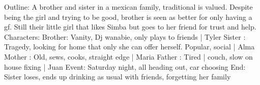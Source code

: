    Outline: A brother and sister in a mexican family, traditional is valued. Despite being the girl and trying to be good, brother
        is seen as better for only having a gf. Still their little girl that likes Simba but goes to her friend for trust and help.
        Characters:
                Brother: Vanity, Dj wanabie, only plays to friends | Tyler
                Sister : Tragedy, looking for home that only she can offer herself. Popular, social | Alma
                Mother : Old, sews, cooks, straight edge | Maria
                Father : Tired | couch, slow on house fixing | Juan
        Event:
                Saturday night, all heading out, car choosing
        End:
                Sister loses, ends up drinking as usual with friends, forgetting her family
